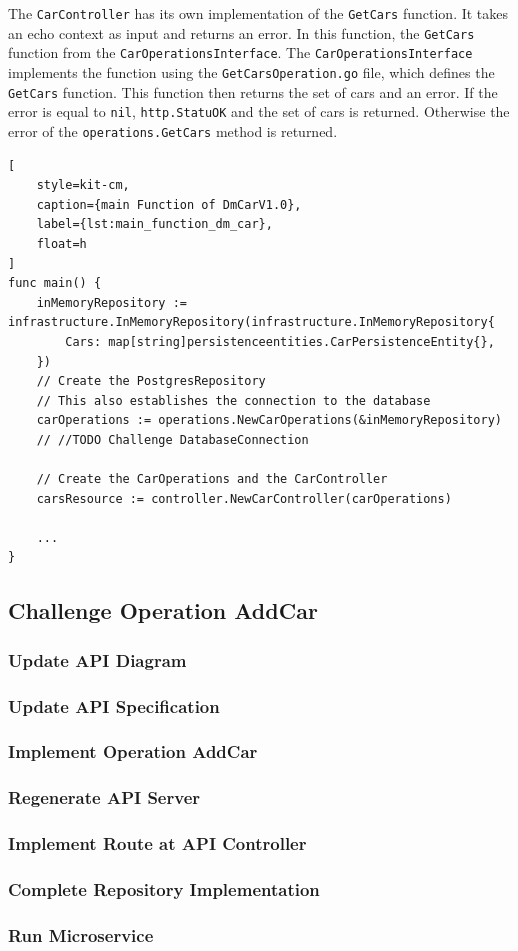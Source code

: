 The \texttt{CarController} has its own implementation of the \texttt{GetCars} function.
It takes an echo context as input and returns an error.
In this function, the \texttt{GetCars} function from the \texttt{CarOperationsInterface}.
The \texttt{CarOperationsInterface} implements the function using the \texttt{GetCarsOperation.go} file, which defines the \texttt{GetCars} function.
This function then returns the set of cars and an error.
If the error is equal to \texttt{nil}, \texttt{http.StatuOK} and the set of cars is returned.
Otherwise the error of the \texttt{operations.GetCars} method is returned.
\begin{lstlisting}[
    style=kit-cm,
    caption={main Function of DmCarV1.0},
    label={lst:main_function_dm_car},
    float=h
]
func main() {
    inMemoryRepository := infrastructure.InMemoryRepository(infrastructure.InMemoryRepository{
        Cars: map[string]persistenceentities.CarPersistenceEntity{},
    })
    // Create the PostgresRepository
    // This also establishes the connection to the database
    carOperations := operations.NewCarOperations(&inMemoryRepository)
    // //TODO Challenge DatabaseConnection

    // Create the CarOperations and the CarController
    carsResource := controller.NewCarController(carOperations)

    ...
}
\end{lstlisting}


\subsection{Challenge Operation AddCar}
\subsubsection*{Update API Diagram}
\subsubsection*{Update API Specification}
\subsubsection*{Implement Operation AddCar}
\subsubsection*{Regenerate API Server}
\subsubsection*{Implement Route at API Controller}
\subsubsection*{Complete Repository Implementation}
\subsubsection*{Run Microservice}